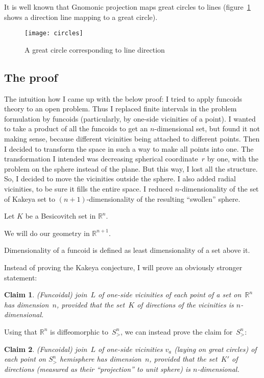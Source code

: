 \documentclass[oneside,draft]{amsart}
\newtheorem{claim}{Claim}
\begin{document}
It is well known that Gnomonic projection maps great circles to lines (figure~\ref{fig:circles} shows a direction line mapping to a great circle).

\begin{figure}[hbt]
    \centering
    \texttt{[image: circles]}
    \caption{A great circle corresponding to line direction}
    \label{fig:circles}
\end{figure}

\subsection{The proof}

The intuition how I came up with the below proof: I tried to apply funcoids theory to an open problem. Thus I replaced finite intervals in the problem formulation by funcoids (particularly, by one-si\-de vicinities of a point). I wanted to take a product of all the funcoids to get an $n$-di\-men\-si\-on\-al set, but found it not making sense, because different vicinities being attached to different points. Then I decided to transform the space in such a way to make all points into one. The transformation I intended was decreasing spherical coordinate~$r$ by one, with the problem on the sphere instead of the plane. But this way, I lost all the structure. So, I decided to move the vicinities outside the sphere. I also added radial vicinities, to be sure it fills the entire space. I reduced $n$-di\-men\-sio\-na\-li\-ty of the set of Kakeya set to $(n+1)$-di\-men\-sio\-na\-li\-ty of the resulting ``swollen'' sphere.

Let $K$ be a Besicovitch set in $\mathbb{R}^n$.

We will do our geometry in $\mathbb{R}^{n+1}$.

Dimensionality of a funcoid is defined as least dimensionality of a set above it.

Instead of proving the Kakeya conjecture, I will prove an obviously stronger statement:

\begin{claim}
(Funcoidal) join~$L$ of one-si\-de vicinities of each point of a set on~$\mathbb{R}^n$ has dimension~$n$, provided that the set~$K$ of directions of the vicinities is $n$-di\-men\-sio\-nal.
\end{claim}

Using that $\mathbb{R}^n$ is diffeomorphic to~$S^n_{>}$, we can instead prove the claim for~$S^n_{>}$:

\begin{claim}
(Funcoidal) join~$L$ of one-si\-de vicinities $v_a$ (laying on great circles) of each point on $S^n_{>}$ hemisphere has dimension~$n$, provided that the set~$K'$ of directions (measured as their ``projection'' to unit sphere) is $n$-di\-men\-sio\-nal.
\end{claim}
\end{document}
